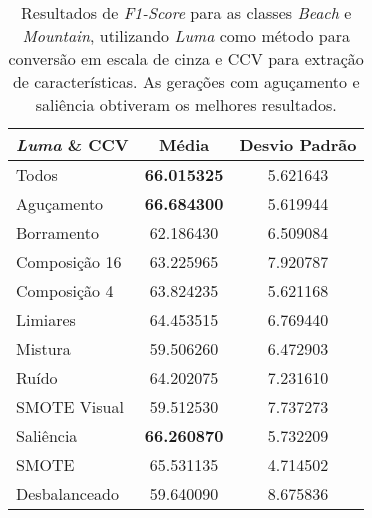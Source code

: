 

\begin{table}[!htbp]
\begin{center}
\caption{Resultados de \textit{F1-Score} para as classes \textit{Beach} e \textit{Mountain}, utilizando \emph{Luma} como método para conversão em escala de cinza e CCV para extração de características. As gerações com aguçamento e saliência obtiveram os melhores resultados.}
\label{tab:resultados:2:melhor}
\begin{tabular}{|l|c|c|}
\hline
\textbf{\emph{Luma} \& CCV} & \textbf{Média}     & \textbf{Desvio Padrão} \\ \hline
   Todos        & \textbf{66.015325} & 5.621643  \\ \hline
  Aguçamento    & \textbf{66.684300} & 5.619944  \\ \hline
  Borramento    & 62.186430 & 6.509084  \\ \hline
  Composição 16 & 63.225965 & 7.920787  \\ \hline
  Composição 4  & 63.824235 & 5.621168  \\ \hline
  Limiares      & 64.453515 & 6.769440  \\ \hline
  Mistura       & 59.506260 & 6.472903  \\ \hline
  Ruído         & 64.202075 & 7.231610  \\ \hline
  SMOTE Visual  & 59.512530 & 7.737273  \\ \hline
  Saliência     & \textbf{66.260870} & 5.732209  \\ \hline
 SMOTE          & 65.531135 & 4.714502  \\ \hline
Desbalanceado   & 59.640090 & 8.675836  \\ \hline
\end{tabular}
\end{center}
\end{table}

